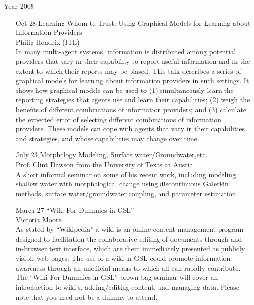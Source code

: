 \documentclass[12]{article}
\begin{document}
\begin{center}
\Large
Year 2009
\end{center}

\begin{enumerate}

\item[Oct 28] Learning Whom to Trust: Using Graphical Models for
  Learning about
  Information Providers\\Philip Hendrix (ITL)\\
  In many multi-agent systems, information is distributed among
  potential providers that vary in their capability to report useful
  information and in the extent to which their reports may be biased.
  This talk describes a series of graphical models for learning about
  information providers in such settings. It shows how graphical
  models can be used to (1) simultaneously learn the reporting
  strategies that agents use and learn their capabilities; (2) weigh
  the benefits of different combinations of information providers; and
  (3) calculate the expected error of selecting different combinations
  of information providers. These models can cope with agents that
  vary in their capabilities and strategies, and whose capabilities
  may change over time.


\item[July 23] Morphology Modeling, Surface water/Groundwater,etc.\\Prof. Clint Dawson from the University of Texas at Austin\\
  A short informal seminar on some of his recent work, including modeling shallow water with morphological change using discontinuous Galerkin methods, surface water/groundwater coupling, and parameter estimation.

\item[March 27] ``Wiki For Dummies in GSL''\\ Victoria Moore\\
  As stated by ``Wikipedia'' a wiki is an online content management program designed to facilitation the collaborative editing of documents through and in-browser text interface, which are them immediately presented as publicly visible web pages.  The use of a wiki in GSL could promote information awareness through an unofficial means to which all can rapidly contribute.  The ``Wiki For Dummies in GSL'' brown bag seminar will cover an introduction to wiki's, adding/editing content, and managing data.  Please note that you need not be a dummy to attend.


\end{enumerate}
\end{document}
